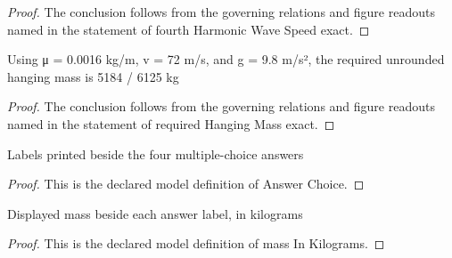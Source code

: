\begin{proof}
  The conclusion follows from the governing relations and figure readouts named in the statement of fourth Harmonic Wave Speed exact.
\end{proof}
\begin{lemma}
  \label{lem:physics:phyx-mini-0298:phyxminiproblems-problemphyxmini0298-requiredhangingmass-exact}
  Using μ = 0.0016 kg/m, v = 72 m/s, and g = 9.8 m/s², the required unrounded hanging mass is 5184 / 6125 kg
\end{lemma}
\begin{proof}
  The conclusion follows from the governing relations and figure readouts named in the statement of required Hanging Mass exact.
\end{proof}
\begin{definition}
  \label{def:physics:phyx-mini-0298:phyxminiproblems-problemphyxmini0298-answerchoice}
  Labels printed beside the four multiple-choice answers
\end{definition}
\begin{proof}
  This is the declared model definition of Answer Choice.
\end{proof}
\begin{definition}
  \label{def:physics:phyx-mini-0298:phyxminiproblems-problemphyxmini0298-answerchoice-massinkilograms}
  Displayed mass beside each answer label, in kilograms
\end{definition}
\begin{proof}
  This is the declared model definition of mass In Kilograms.
\end{proof}
